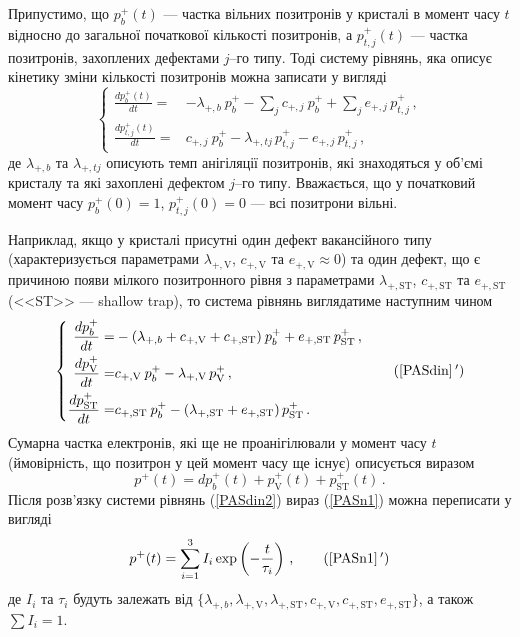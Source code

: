 Припустимо, що
$p_{b}^+(t)$ --- частка вільних позитронів у кристалі в момент часу $t$ відносно до загальної початкової кількості позитронів, а
$p_{t,j}^+(t)$  --- частка позитронів, захоплених дефектами $j$--го типу.
Тоді систему рівнянь, яка описує кінетику зміни кількості позитронів можна записати у вигляді
\begin{equation}\label{PASdin}
\left\{
\begin{aligned}%
\frac{dp_{b}^+(t)}{dt}=& -\lambda_{+,b} \:p_{b}^+ - \sum_j c_{+,j} \:p_{b}^+ + \sum_j e_{+,j} \,p_{t,j}^+ \,,\\
\frac{dp_{t,j}^+(t)}{dt}=& c_{+,j} \:p_{b}^+ - \lambda_{+,tj}\,p_{t,j}^+ - e_{+,j} \,p_{t,j}^+ \,,
\end{aligned} \right.
\end{equation}
де
$\lambda_{+,b}$ та $\lambda_{+,tj}$ описують темп анігіляції позитронів, які знаходяться
у об'ємі кристалу та які захоплені дефектом $j$--го  типу.
Вважається, що у початковий момент часу $p_{b}^+(0)=1$, $p_{t,j}^+(0)=0$ --- всі позитрони вільні.

Наприклад, якщо у кристалі присутні один дефект вакансійного типу
(характеризується параметрами $\lambda_{+,\mathrm{V}}$, $c_{+,\mathrm{V}}$ та $e_{+,\mathrm{V}}\approx0$)
та один дефект, що є причиною появи мілкого позитронного рівня з параметрами
$\lambda_{+,\mathrm{ST}}$, $c_{+,\mathrm{ST}}$ та $e_{+,\mathrm{ST}}$ (<<ST>> --- shallow trap),
то система рівнянь виглядатиме наступним чином
\begin{equation}\label{PASdin2}
\left\{
\begin{aligned}%
\frac{dp_{b}^+}{dt}=& -(\lambda_{+,b}+c_{+,\mathrm{V}}+c_{+,\mathrm{ST}}) \:p_{b}^+ +e_{+,\mathrm{ST}}\,p_{\mathrm{ST}}^+ \,,\\
\frac{dp_{\mathrm{V}}^+}{dt}=& c_{+,\mathrm{V}} \:p_{b}^+ - \lambda_{+,\mathrm{V}}\,p_{\mathrm{V}}^+ \,,\\
\frac{dp_{\mathrm{ST}}^+}{dt}=& c_{+,\mathrm{ST}} \:p_{b}^+ - (\lambda_{+,\mathrm{ST}}+e_{+,\mathrm{ST}})\,p_{\mathrm{ST}}^+ \,.
\end{aligned} \right.\tag{\ref{PASdin}\,$'$}
\end{equation}
Сумарна частка електронів, які ще не проанігілювали у момент часу $t$
(ймовірність, що позитрон у цей момент часу ще існує) описується виразом
\begin{equation}\label{PASn1}
p^+(t)=dp_{b}^+(t) + p_{\mathrm{V}}^+(t) + p_{\mathrm{ST}}^+(t)\,.
\end{equation}
Після розв'язку системи рівнянь (\ref{PASdin2}) вираз (\ref{PASn1})  можна
переписати у вигляді
\begin{equation}\label{PASn2}
p^+(t)=\sum_{i=1}^3I_i\exp\left(-\frac{t}{\tau_i}\right)\,,\tag{\ref{PASn1}\,$'$}
\end{equation}
де
$I_i$ та $\tau_i$ будуть залежать від $\{\lambda_{+,b},\lambda_{+,\mathrm{V}},\lambda_{+,\mathrm{ST}},c_{+,\mathrm{V}},c_{+,\mathrm{ST}},e_{+,\mathrm{ST}}\}$,
а також $\sum I_i=1$.

